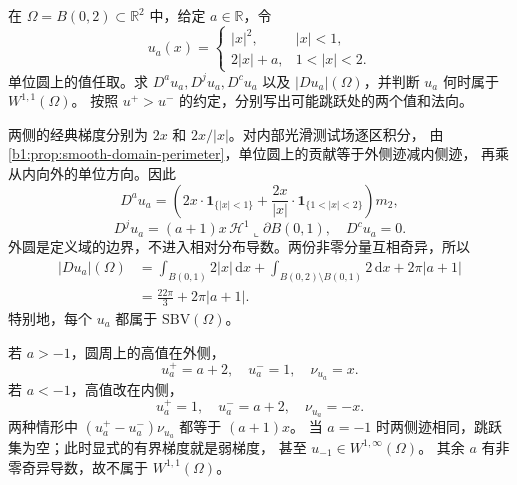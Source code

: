 \begin{exercise}\label{b1:ex:28-radial-piecewise-decomposition}
在 \(\Omega=B(0,2)\subset\mathbb R^2\) 中，给定 \(a\in\mathbb R\)，令
\[
 u_a(x)=
 \begin{cases}
 |x|^2,&|x|<1,\\
 2|x|+a,&1<|x|<2.
 \end{cases}
\]
单位圆上的值任取。求 \(D^au_a,D^ju_a,D^cu_a\) 以及
\(|Du_a|(\Omega)\)，并判断 \(u_a\) 何时属于 \(W^{1,1}(\Omega)\)。
按照 \(u^+>u^-\) 的约定，分别写出可能跳跃处的两个值和法向。
\end{exercise}
\begin{solution}
两侧的经典梯度分别为 \(2x\) 和 \(2x/|x|\)。对内部光滑测试场逐区积分，
由\cref{b1:prop:smooth-domain-perimeter}，单位圆上的贡献等于外侧迹减内侧迹，
再乘从内向外的单位方向。因此
\[
 D^au_a=
 \left(2x\cdot\mathbf1_{\{|x|<1\}}
       +\frac{2x}{|x|}\cdot\mathbf1_{\{1<|x|<2\}}\right)m_2,
\]
\[
 D^ju_a=(a+1)x\,\mathcal H^1\llcorner\partial B(0,1),
 \quad D^cu_a=0.
\]
外圆是定义域的边界，不进入相对分布导数。两份非零分量互相奇异，所以
\[
 \begin{aligned}
 |Du_a|(\Omega)
 &=\int_{B(0,1)}2|x|\,\mathrm dx
   +\int_{B(0,2)\setminus B(0,1)}2\,\mathrm dx
   +2\pi|a+1|\\
 &=\frac{22\pi}{3}+2\pi|a+1|.
 \end{aligned}
\]
特别地，每个 \(u_a\) 都属于 \(\mathrm{SBV}(\Omega)\)。

若 \(a>-1\)，圆周上的高值在外侧，
\[
 u_a^+=a+2,\quad u_a^-=1,\quad \nu_{u_a}=x.
\]
若 \(a<-1\)，高值改在内侧，
\[
 u_a^+=1,\quad u_a^-=a+2,\quad \nu_{u_a}=-x.
\]
两种情形中 \((u_a^+-u_a^-)\nu_{u_a}\) 都等于 \((a+1)x\)。
当 \(a=-1\) 时两侧迹相同，跳跃集为空；此时显式的有界梯度就是弱梯度，
甚至 \(u_{-1}\in W^{1,\infty}(\Omega)\)。
其余 \(a\) 有非零奇异导数，故不属于 \(W^{1,1}(\Omega)\)。
\end{solution}

